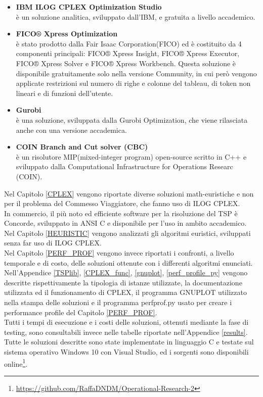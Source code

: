\begin{itemize}
\item{\textbf{IBM ILOG CPLEX Optimization Studio}\cite{ILOG}\\
è un soluzione analitica, sviluppato dall'IBM, e gratuita a livello accademico.}
\item{\textbf{FICO® Xpress Optimization}\cite{FICO}\\
è stato prodotto dalla Fair Isaac Corporation(FICO) ed è costituito da 4 componenti principali: FICO® Xpress Insight, FICO® Xpress Executor, FICO® Xpress Solver e FICO® Xpress Workbench. Questa soluzione è disponibile gratuitamente solo nella versione Community, in cui però vengono applicate restrizioni sul numero di righe e colonne del tableau, di token non lineari e di funzioni dell'utente.}
\item{\textbf{Gurobi}\cite{GUROBI}\\
è una soluzione, sviluppata dalla Gurobi Optimization, che viene rilasciata anche con una versione accademica.}
\item{\textbf{COIN Branch and Cut solver (CBC)}\cite{CBC}\\
è un risolutore MIP(mixed-integer program) open-source scritto in C++ e sviluppato dalla Computational Infrastructure for Operations Researc (COIN).}
\end{itemize}
Nel Capitolo \ref{CPLEX} vengono riportate diverse soluzioni math-euristiche e non per il problema del Commesso Viaggiatore, che fanno uso di ILOG CPLEX.\\
In commercio, il più noto ed efficiente software per la risoluzione del TSP è Concorde, sviluppato in ANSI C e disponibile per l'uso in ambito accademico\cite{concorde}.\\
Nel Capitolo \ref{HEURISTIC} vengono analizzati gli algoritmi euristici, sviluppati senza far uso di ILOG CPLEX.\\
Nel Capitolo \ref{PERF_PROF} vengono invece riportati i confronti, a livello temporale e di costo, delle soluzioni ottenute con i differenti algoritmi enunciati.\\
Nell'Appendice \ref{TSPlib}, \ref{CPLEX_func}, \ref{gnuplot}, \ref{perf_profile_py} vengono descritte rispettivamente la tipologia di istanze utilizzate, la documentazione utilizzata ed il funzionamento di CPLEX, il programma GNUPLOT utilizzato nella stampa delle soluzioni e il programma perfprof.py usato per creare i performance profile del Capitolo \ref{PERF_PROF}.\\
Tutti i tempi di esecuzione e i costi delle soluzioni, ottenuti mediante la fase di testing, sono consultabili invece nelle tabelle riportate nell'Appendice \ref{results}. Tutte le soluzioni descritte sono state implementate in linguaggio C e testate sul sistema operativo Windows 10 con Visual Studio, ed i sorgenti sono disponibili online\footnote{\url{https://github.com/RaffaDNDM/Operational-Research-2}}.